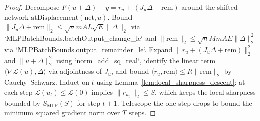 \begin{proof}
\leanok
Decompose $F(u+\Delta) - y = r_u + (J_u\Delta + \mathrm{rem})$ around the shifted network $\mathrm{atDisplacement}(\mathrm{net}, u)$. Bound $\|J_u\Delta + \mathrm{rem}\|_2 \le \sqrt{n} m A L\sqrt{E}\|\Delta\|_2$ via `MLPBatchBounds.batchOutput_change_le` and $\|\mathrm{rem}\|_2 \le \sqrt{n} M m A E\|\Delta\|_2^2$ via `MLPBatchBounds.output_remainder_le`. Expand $\|r_u + (J_u\Delta + \mathrm{rem})\|_2^2$ and $\|u+\Delta\|_2^2$ using `norm_add_sq_real`, identify the linear term $\langle \nabla\mathcal{L}(u), \Delta\rangle$ via adjointness of $J_u$, and bound $\langle r_u, \mathrm{rem}\rangle \le R\|\mathrm{rem}\|_2$ by Cauchy--Schwarz. Induct on $t$ using Lemma~\ref{lem:local_sharpness_descent}: at each step $\mathcal{L}(u_t)\le \mathcal{L}(0)$ implies $\|r_{u_t}\|_2\le S$, which keeps the local sharpness bounded by $S_{\mathrm{MLP}}(S)$ for step $t+1$. Telescope the one-step drops to bound the minimum squared gradient norm over $T$ steps.
\end{proof}

